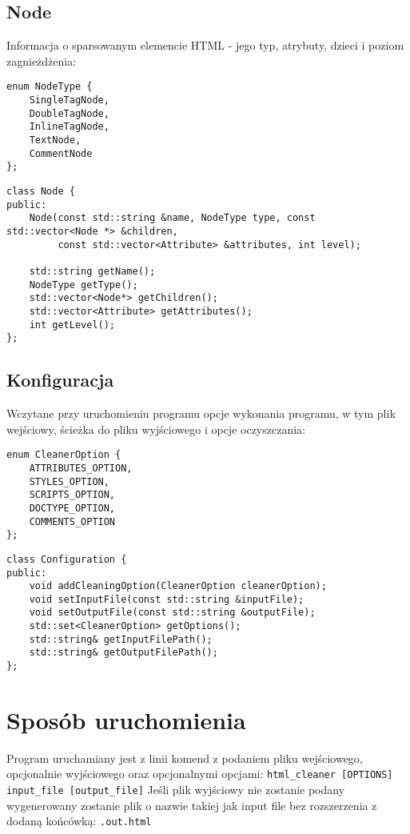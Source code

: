 \documentclass[11pt]{article}
\def\code#1{\texttt{#1}}
\begin{document}
\subsection{Node}
Informacja o sparsowanym elemencie HTML - jego typ, atrybuty, dzieci i poziom zagnieżdżenia:
\begin{lstlisting}
enum NodeType {
    SingleTagNode,
    DoubleTagNode,
    InlineTagNode,
    TextNode,
    CommentNode
};
\end{lstlisting}
\begin{lstlisting}
class Node {
public:
    Node(const std::string &name, NodeType type, const std::vector<Node *> &children,
         const std::vector<Attribute> &attributes, int level);

    std::string getName();
    NodeType getType();
    std::vector<Node*> getChildren();
    std::vector<Attribute> getAttributes();
    int getLevel();
};
\end{lstlisting}

\subsection{Konfiguracja}
Wczytane przy uruchomieniu programu opcje wykonania programu, w tym plik wejściowy, ścieżka do pliku wyjściowego i opcje oczyszczania:
\begin{lstlisting}
enum CleanerOption {
    ATTRIBUTES_OPTION,
    STYLES_OPTION,
    SCRIPTS_OPTION,
    DOCTYPE_OPTION,
    COMMENTS_OPTION
};
\end{lstlisting}
\begin{lstlisting}
class Configuration {
public:
    void addCleaningOption(CleanerOption cleanerOption);
    void setInputFile(const std::string &inputFile);
    void setOutputFile(const std::string &outputFile);
    std::set<CleanerOption> getOptions();
    std::string& getInputFilePath();
    std::string& getOutputFilePath();
};
\end{lstlisting}

\section{Sposób uruchomienia}
Program uruchamiany jest z linii komend z podaniem pliku wejściowego, opcjonalnie wyjściowego oraz opcjonalnymi opcjami: \code{html\_cleaner [OPTIONS] input\_file [output\_file]}
Jeśli plik wyjściowy nie zostanie podany wygenerowany zostanie plik o nazwie takiej jak input file bez rozszerzenia z dodaną końcówką: \code{.out.html}
\end{document}

